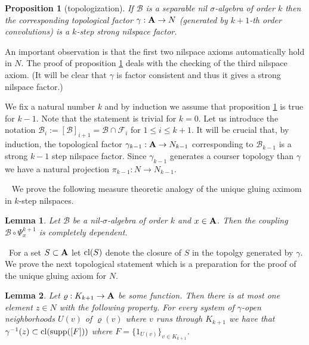 \documentclass [11pt] {article}
\newtheorem{lemma}{Lemma}[section]
\newtheorem{proposition}{Proposition}[section]
\def\cl{{\rm cl}}
\def\bA{{\bf A}}
\begin{document}
\begin{proposition}[topologization]\label{topologization}If $\mathcal{B}$ is a separable nil $\sigma$-algebra of order $k$ then the corresponding topological factor $\gamma:\bA\rightarrow N$ (generated by $k+1$-th order convolutions) is a $k$-step strong nilspace factor. 
\end{proposition}

An important observation is that the first two nilspace axioms automatically hold in $N$.
The proof of proposition \ref{topologization} deals with the checking of the third nilspace axiom. 
(It will be clear that $\gamma$ is factor consistent and thus it gives a strong nilspace factor.)

We fix a natural number $k$ and by induction we assume that proposition \ref{topologization} is true for $k-1$.
Note that the statement is trivial for $k=0$. Let us introduce the notation  $\mathcal{B}_i:=[\mathcal{B}]_{i+1}=\mathcal{B}\cap\mathcal{F}_i$ for $1\leq i\leq k+1$.
It will be crucial that, by induction, the topological factor $\gamma_{k-1}:\bA\rightarrow N_{k-1}$ corresponding to $\mathcal{B}_{k-1}$ is a strong $k-1$ step nilspace factor. Since $\gamma_{k-1}$ generates a courser topology than $\gamma$ we have a natural projection $\pi_{k-1}:N\rightarrow N_{k-1}$.

\bigskip



~ We prove the following measure theoretic analogy of the unique gluing aximom in $k$-step nilspaces. 

\begin{lemma}\label{compdep} Let $\mathcal{B}$ be a nil-$\sigma$-algebra of order $k$ and $x\in\bA$. Then the coupling $\mathcal{B}\circ\Psi^{k+1}_x$ is completely dependent. 
\end{lemma}

\bigskip

~For a set $S\subset \bA$ let $\cl(S)$ denote the closure of $S$ in the topolgy generated by $\gamma$. We prove the next topological statement which is a preparation for the proof of the unique gluing axiom for $N$. 

\begin{lemma}\label{uclos} Let $\varrho:K_{k+1}\rightarrow\bA$ be some function. Then there is at most one element $z
\in N$ with the following property. For every system of $\gamma$-open neighborhoods $U(v)$ of $\varrho(v)$ where $v$ runs through $K_{k+1}$ we have that $\gamma^{-1}(z)\subset\cl({\rm supp}([F]))$ where $F=\{1_{U(v)}\}_{v\in K_{k+1}}$. 
\end{lemma}
\end{document}
